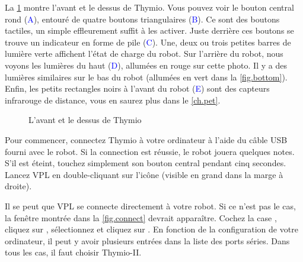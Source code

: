 

La \cref{fig.front} montre l'avant et le dessus de Thymio.
Vous pouvez voir le bouton central rond (\textcolor{blue}{A}), entouré de quatre boutons triangulaires (\textcolor{blue}{B}).
Ce sont des boutons tactiles, un simple effleurement suffit à les activer.
Juste derrière ces boutons se trouve un indicateur en forme de pile (\textcolor{blue}{C}).
Une, deux ou trois petites barres de lumière verte affichent l'état de charge du robot.
Sur l'arrière du robot, nous voyons les lumières du haut (\textcolor{blue}{D}), allumées en rouge sur cette photo.
Il y a des lumières similaires sur le bas du robot (allumées en vert dans la \cref{fig.bottom}).
Enfin, les petits rectangles noirs à l'avant du robot (\textcolor{blue}{E}) sont des capteurs infrarouge de distance, vous en saurez plus dans le \cref{ch.pet}.

\begin{figure}[h]
\begin{center}
\caption{L'avant et le dessus de Thymio}\label{fig.front}
\end{center}
\end{figure} 

\pagebreak


Pour commencer, connectez Thymio à votre ordinateur à l'aide du câble USB fourni avec le robot.
Si la connection est réussie, le robot jouera quelques notes.
S'il est éteint, touchez simplement son bouton central pendant cinq secondes.
Lancez VPL en double-cliquant sur l'icône  (visible en grand dans la marge à droite).

Il se peut que VPL se connecte directement à votre robot.
Si ce n'est pas le cas, la fenêtre montrée dans la \cref{fig.connect} devrait apparaître.
Cochez la case , cliquez sur , sélectionnez  et cliquez sur .
En fonction de la configuration de votre ordinateur, il peut y avoir plusieurs entrées dans la liste des ports séries.
Dans tous les cas, il faut choisir Thymio-II.

\vfill


